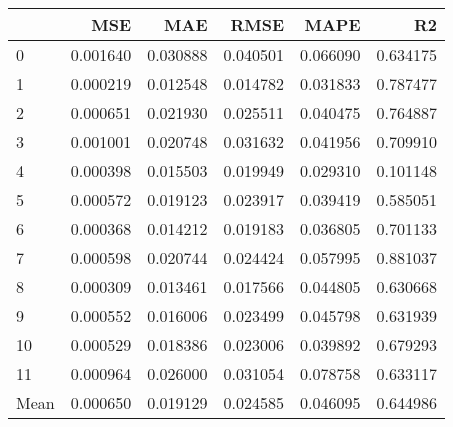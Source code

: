 \begin{tabular}{lrrrrr}
\toprule
 & MSE & MAE & RMSE & MAPE & R2 \\
\midrule
0 & 0.001640 & 0.030888 & 0.040501 & 0.066090 & 0.634175 \\
1 & 0.000219 & 0.012548 & 0.014782 & 0.031833 & 0.787477 \\
2 & 0.000651 & 0.021930 & 0.025511 & 0.040475 & 0.764887 \\
3 & 0.001001 & 0.020748 & 0.031632 & 0.041956 & 0.709910 \\
4 & 0.000398 & 0.015503 & 0.019949 & 0.029310 & 0.101148 \\
5 & 0.000572 & 0.019123 & 0.023917 & 0.039419 & 0.585051 \\
6 & 0.000368 & 0.014212 & 0.019183 & 0.036805 & 0.701133 \\
7 & 0.000598 & 0.020744 & 0.024424 & 0.057995 & 0.881037 \\
8 & 0.000309 & 0.013461 & 0.017566 & 0.044805 & 0.630668 \\
9 & 0.000552 & 0.016006 & 0.023499 & 0.045798 & 0.631939 \\
10 & 0.000529 & 0.018386 & 0.023006 & 0.039892 & 0.679293 \\
11 & 0.000964 & 0.026000 & 0.031054 & 0.078758 & 0.633117 \\
Mean & 0.000650 & 0.019129 & 0.024585 & 0.046095 & 0.644986 \\
\bottomrule
\end{tabular}
